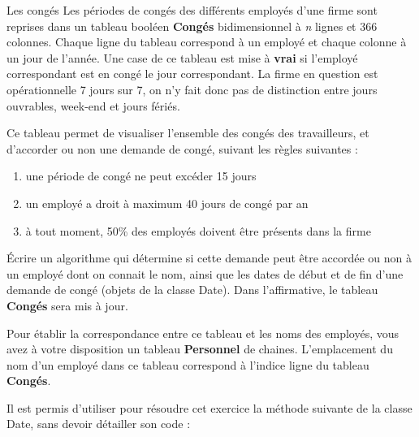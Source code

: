 \begin{Exercice}{Les congés}
	Les périodes de congés des différents employés d’une firme sont reprises
	dans un tableau booléen \textbf{Congés} bidimensionnel à \textit{n}
	lignes et 366 colonnes. Chaque ligne du tableau correspond à un employé
	et chaque colonne à un jour de l’année. Une case de ce tableau est mise
	à \textbf{vrai} si l’employé correspondant est en congé le jour
	correspondant. La firme en question est opérationnelle 7 jours sur 7,
	on n’y fait donc pas de distinction entre jours ouvrables, week-end et
	jours fériés.

	Ce tableau permet de visualiser l’ensemble des congés des travailleurs,
	et d’accorder ou non une demande de congé, suivant les règles suivantes :

	\begin{enumerate}
		\item 
			une période de congé ne peut excéder 15 jours
		\item 
			un employé a droit à maximum 40 jours de congé par an
		\item 
			à tout moment, 50\% des employés doivent être présents dans la firme
	\end{enumerate}
	
	Écrire un algorithme qui détermine si cette demande peut être accordée
	ou non à un employé dont on connait le nom, ainsi que les dates de
	début et de fin d’une demande de congé (objets de la classe Date). Dans
	l’affirmative, le tableau \textbf{Congés} sera mis à jour.

	Pour établir la correspondance entre ce tableau et les noms des
	employés, vous avez à votre disposition un tableau \textbf{Personnel}
	de chaines. L’emplacement du nom d’un employé dans ce tableau
	correspond à l’indice ligne du tableau \textbf{Congés}.

	Il est permis d’utiliser pour résoudre cet exercice la méthode suivante
	de la classe Date, sans devoir détailler son code :
	
\end{Exercice}

